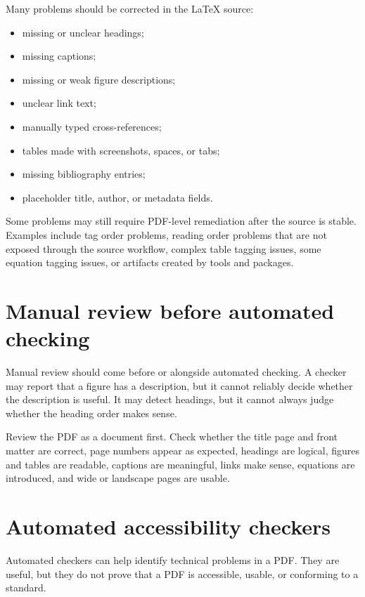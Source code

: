 Many problems should be corrected in the \LaTeX{} source:

\begin{itemize}
  \item missing or unclear headings;
  \item missing captions;
  \item missing or weak figure descriptions;
  \item unclear link text;
  \item manually typed cross-references;
  \item tables made with screenshots, spaces, or tabs;
  \item missing bibliography entries;
  \item placeholder title, author, or metadata fields.
\end{itemize}

Some problems may still require PDF-level remediation after the source is stable. Examples include tag order problems, reading order problems that are not exposed through the source workflow, complex table tagging issues, some equation tagging issues, or artifacts created by tools and packages.

\section{Manual review before automated checking}
\label{sec:manual-review-before-automated}

Manual review should come before or alongside automated checking. A checker may report that a figure has a description, but it cannot reliably decide whether the description is useful. It may detect headings, but it cannot always judge whether the heading order makes sense.

Review the PDF as a document first. Check whether the title page and front matter are correct, page numbers appear as expected, headings are logical, figures and tables are readable, captions are meaningful, links make sense, equations are introduced, and wide or landscape pages are usable.

\section{Automated accessibility checkers}
\label{sec:automated-accessibility-checkers}

Automated checkers can help identify technical problems in a PDF. They are useful, but they do not prove that a PDF is accessible, usable, or conforming to a standard.

